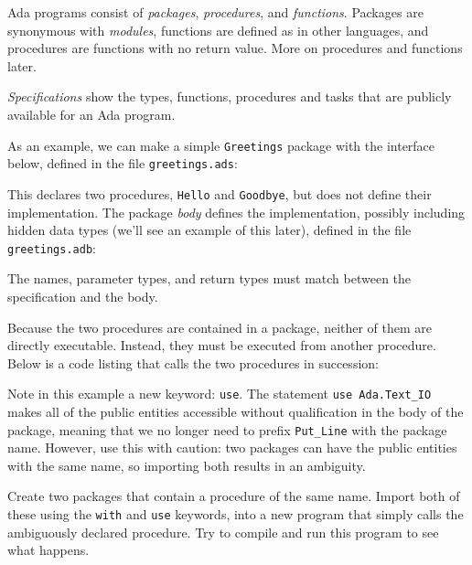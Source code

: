 Ada programs consist of \emph{packages}, \emph{procedures}, and \emph{functions}. Packages are synonymous with \emph{modules}, functions are defined as in other languages, and procedures are functions with no return value. More on procedures and functions later.

\emph{Specifications} show the types, functions, procedures and tasks that are publicly available for an Ada program.

As an example, we can make a simple \texttt{Greetings} package with the interface below, defined in the file \texttt{greetings.ads}:




This declares two procedures, \texttt{Hello} and \texttt{Goodbye}, but does not define their implementation. The package \emph{body} defines the implementation, possibly including hidden data types (we'll see an example of this later), defined in the file \texttt{greetings.adb}:



The names, parameter types, and return types must match between the specification and the body.

Because the two procedures are contained in a package, neither of them are directly executable. Instead, they must be executed from another procedure. Below is a code listing that calls the two procedures in succession:



Note in this example a new keyword: \texttt{use}.  The statement \texttt{use Ada.Text\_IO} makes all of the public entities accessible without qualification in the body of the package, meaning that we no longer need to prefix \texttt{Put\_Line} with the package name. However, use this with caution: two packages can have the public entities with the same name, so importing both results in an ambiguity.

\begin{exercise}
Create two packages that contain a procedure of the same name. Import both of these using the \texttt{with} and \texttt{use} keywords, into a new program that simply calls the ambiguously declared procedure. Try to compile and run this program to see what happens.
\end{exercise}


